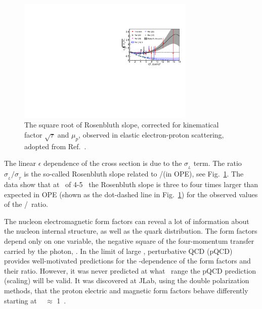 \begin{figure}[h]
\includegraphics[trim = 0mm 0mm 0mm 40mm, width = 0.75\textwidth]{Plots/Fig1.pdf}
\caption{The square root of Rosenbluth slope, corrected for kinematical factor $\sqrt {\tau}$ and $\mu_p$, observed in elastic electron-proton scattering,
adopted from Ref.~\cite{Christy2020ab}.}
\label{pic:Fig1}
\end{figure}

The linear $\epsilon$ dependence of the cross section is due to the $\sigma_{_L}$ term. %
The ratio $\sigma_{_L}/\sigma_{_T}$ is the so-called Rosenbluth slope related to \gef/\gmf (in OPE), see Fig.~\ref{pic:Fig1}.
The data show that at \qsq~of 4-5 \gevcsq~the Rosenbluth slope is three to four times larger than expected in OPE (shown as the dot-dashed line in Fig.~\ref{pic:Fig1}) for the observed values of the \gep/\gmp~ratio.

%
The nucleon electromagnetic form factors can reveal a lot of information about the nucleon internal structure, as well as the quark distribution. 
The form factors depend only on one variable, the negative square of the four-momentum transfer carried by the photon, \qsq. 
In the limit of large \qsq, perturbative QCD (pQCD) provides well-motivated predictions for the \qsq-dependence of the form factors and their ratio. 
However, it was never predicted at what \qsq~range the pQCD prediction (scaling) will be valid.
It was discovered at JLab, using the double polarization methods, that the proton electric and magnetic form factors behave differently starting at \qsq~ $\approx$ 1~\gevcsq.
 
